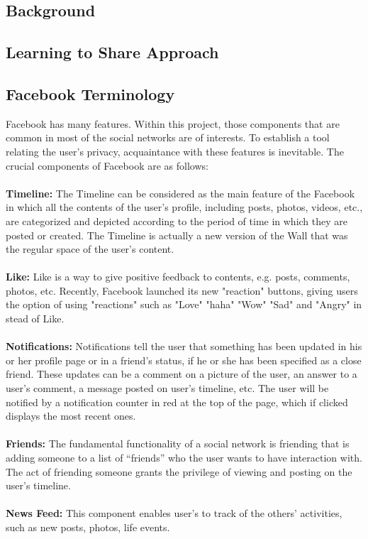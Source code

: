 \documentclass[a4paper,11pt]{article}
\begin{document}
 \subsection{Background}
 
 \subsection{Learning to Share Approach}

 
 
\subsection{Facebook Terminology}


Facebook has many features. Within this project, those components that are common in most of the social networks are of interests. To establish a tool relating the user’s privacy, acquaintance with these features is inevitable. The crucial components of Facebook are as follows:
\\\\
\noindent \textbf{Timeline:} The Timeline can be considered as the main feature of the Facebook in which all the contents of the user’s profile, including posts, photos, videos, etc., are categorized and depicted according to the period of time in which they are posted or created. The Timeline is actually a new version of the Wall that was the regular space of the user’s content.
\\\\
\noindent \textbf{Like:}
Like is a way to give positive feedback to contents, e.g. posts, comments, photos, etc. Recently, Facebook launched its new "reaction" buttons, giving users the option of using "reactions" such as "Love" "haha" "Wow" "Sad" and "Angry" in stead of Like.
\\\\
\noindent \textbf{Notifications:}
Notifications tell the user that something has been updated in his or her profile page or in a friend’s status, if he or she has been specified as a close friend. These updates can be a comment on a picture of the user, an answer to a user’s comment, a message posted on user’s timeline, etc. The user will be notified by a notification counter in red at the top of the page, which if clicked displays the most recent ones.
\\\\
\noindent \textbf{Friends:}
The fundamental functionality of a social network is friending that is adding someone to a list of “friends” who the user wants to have interaction with. The act of friending someone grants the privilege of viewing and posting on the user’s timeline. 
\\\\
\noindent \textbf{News Feed:}
This component enables user’s to track of the others’ activities, such as new posts, photos, life events.
\end{document}
